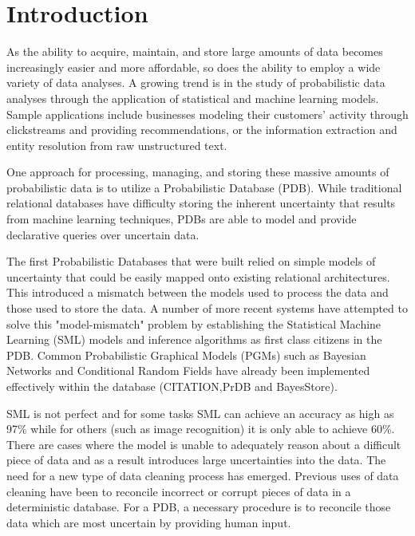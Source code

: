 \section{Introduction}
As the ability to acquire, maintain, and store large amounts of data becomes increasingly easier and more affordable, so does the ability to employ a wide variety of data analyses.  A growing trend is in the study of probabilistic data analyses through the application of statistical and machine learning models.  Sample applications include businesses modeling their customers' activity through clickstreams and providing recommendations, or the information extraction and entity resolution from raw unstructured text.

One approach for processing, managing, and storing these massive amounts of probabilistic data is to utilize a Probabilistic Database (PDB).  While traditional relational databases have difficulty storing the inherent uncertainty that results from machine learning techniques, PDBs are able to model and provide declarative queries over uncertain data.

The first Probabilistic Databases that were built relied on simple models of uncertainty that could be easily mapped onto existing relational architectures.  This introduced a mismatch between the models used to process the data and those used to store the data.  A number of more recent systems have attempted to solve this "model-mismatch" problem by establishing the Statistical Machine Learning (SML) models and inference algorithms as first class citizens in the PDB.  Common Probabilistic Graphical Models (PGMs) such as Bayesian Networks and Conditional Random Fields have already been implemented effectively within the database (CITATION,PrDB and BayesStore).  

SML is not perfect and for some tasks SML can achieve an accuracy as high as 97\% while for others (such as image recognition) it is only able to achieve 60\%.  There are cases where the model is unable to adequately reason about a difficult piece of data and as a result introduces large uncertainties into the data.  The need for a new type of data cleaning process has emerged.  Previous uses of data cleaning have been to reconcile incorrect or corrupt pieces of data in a deterministic database.  For a PDB, a necessary procedure is to reconcile those data which are most uncertain by providing human input.  

